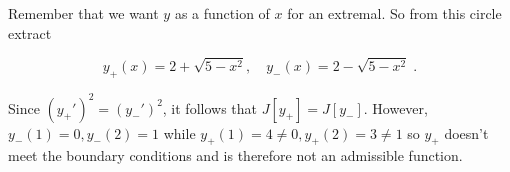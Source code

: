 \documentclass[a4paper]{article}
\begin{document}
Remember that we want $y$ as a function of $x$ for an extremal. So from this circle extract

$$y_+(x) = 2+\sqrt{5-x^2}, \quad y_-(x) = 2- \sqrt{5-x^2} \;.$$

Since $(y_+')^2 = (y_-')^2$, it follows that $J[y_+] = J[y_-]$. However, $y_-(1) = 0, y_-(2) = 1$ while $y_+(1) = 4 \neq 0, y_+(2) = 3 \neq 1$ so $y_+$ doesn't meet the boundary conditions and is therefore not an admissible function. 
\end{document}
